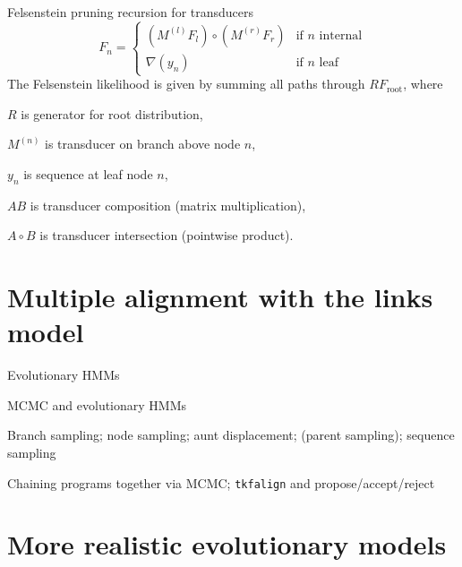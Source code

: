 \documentclass{beamer}
\begin{document}
\begin{frame}{}
Felsenstein pruning recursion for transducers
\[
F_n = \left\{
\begin{array}{ll}
\left( M^{(l)} F_l \right) \circ \left( M^{(r)} F_r \right) & \mbox{if $n$ internal} \\
\nabla(y_n) & \mbox{if $n$ leaf}
\end{array}
\right.
\]
The Felsenstein likelihood is given by summing all paths through $R F_{\mbox{root}}$,
where
\itemb
\item $R$ is generator for root distribution,
\item $M^{(n)}$ is transducer on branch above node $n$,
\item $y_n$ is sequence at leaf node $n$,
\item $AB$ is transducer composition (matrix multiplication),
\item $A \circ B$ is transducer intersection (pointwise product).
\iteme
\end{frame}


\section{Multiple alignment with the links model}

\begin{frame}{}

\itemb
\item Evolutionary HMMs
\item MCMC and evolutionary HMMs
 \itemb
 \item Branch sampling; node sampling; aunt displacement; (parent sampling); sequence sampling
 \item Chaining programs together via MCMC; {\tt tkfalign} and propose/accept/reject
 \iteme
\iteme

\end{frame}

\section{More realistic evolutionary models}
\end{document}
